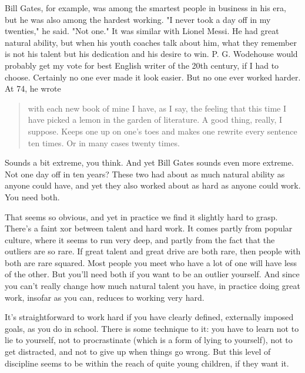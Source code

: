 Bill Gates, for example, was among the smartest
                  people in business in his era, but he was also among the
                  hardest working. "I never took a day off in my twenties," he
                  said. "Not one." It was similar with Lionel Messi. He had
                  great natural ability, but when his youth coaches talk about
                  him, what they remember is not his talent but his dedication
                  and his desire to win. P. G. Wodehouse would probably get my
                  vote for best English writer of the 20th century, if I had to
                  choose. Certainly no one ever made it look easier. But no one
                  ever worked harder. At 74, he wrote
                  \begin{quote}

                    with each new book of mine I have, as I say, the feeling
                    that this time I have picked a lemon in the garden of
                    literature. A good thing, really, I suppose. Keeps one up on
                    one's toes and makes one rewrite every sentence ten times.
                    Or in many cases twenty times.
                  
\end{quote}

                  Sounds a bit extreme, you think. And yet Bill Gates sounds
                  even more extreme. Not one day off in ten years? These two had
                  about as much natural ability as anyone could have, and yet
                  they also worked about as hard as anyone could work. You need
                  both.

That seems so obvious, and yet in practice we
                  find it slightly hard to grasp. There's a faint xor between
                  talent and hard work. It comes partly from popular culture,
                  where it seems to run very deep, and partly from the fact that
                  the outliers are so rare. If great talent and great drive are
                  both rare, then people with both are rare squared. Most people
                  you meet who have a lot of one will have less of the other.
                  But you'll need both if you want to be an outlier yourself.
                  And since you can't really change how much natural talent you
                  have, in practice doing great work, insofar as you can,
                  reduces to working very hard.

It's straightforward
                  to work hard if you have clearly defined, externally imposed
                  goals, as you do in school. There is some technique to it: you
                  have to learn not to lie to yourself, not to procrastinate
                  (which is a form of lying to yourself), not to get distracted,
                  and not to give up when things go wrong. But this level of
                  discipline seems to be within the reach of quite young
                  children, if they want it.

